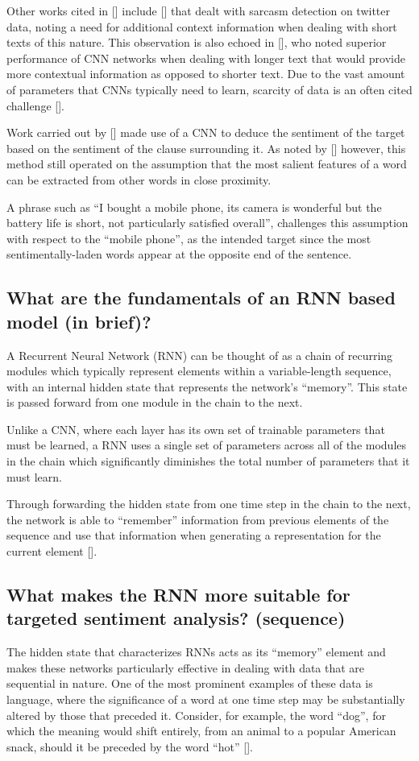 \documentclass[12pt, a4paper]{report}
\theoremstyle{definition}
\theoremstyle{definition}%
\theoremstyle{definition}%
\theoremstyle{definition}%
\theoremstyle{definition}%
\theoremstyle{definition}%
\renewcommand{\cite}[1]{[\citealp{#1}]}
\begin{document}
Other works cited in \cite{young2017} include \cite{poria2016} that dealt with sarcasm detection on twitter data, noting a need for additional context information when dealing with short texts of this nature. This observation is also echoed in \cite{johnsonzhang2015}, who noted superior performance of CNN networks when dealing with longer text that would provide more contextual information as opposed to shorter text. Due to the vast amount of parameters that CNNs typically need to learn, scarcity of data is an often cited challenge \cite{young2017}.

Work carried out by \cite{chen2016} made use of a CNN to deduce the sentiment of the target based on the sentiment of the clause surrounding it. As noted by \cite{chen2017} however, this method still operated on the assumption that the most salient features of a word can be extracted from other words in close proximity.

A phrase such as \enquote{I bought a mobile phone, its camera is wonderful but the battery life is short, not particularly satisfied overall}, challenges this assumption with respect to the \enquote{mobile phone}, as the intended target since the most sentimentally-laden words appear at the opposite end of the sentence.

\subsection{What are the fundamentals of an RNN based model (in brief)?}
A Recurrent Neural Network (RNN) can be thought of as a chain of recurring modules which typically represent elements within a variable-length sequence, with an internal hidden state that represents the network's \enquote{memory}. This state is passed forward from one module in the chain to the next.

Unlike a CNN, where each layer has its own set of trainable parameters that must be learned, a RNN uses a single set of parameters across all of the modules in the chain which significantly diminishes the total number of parameters that it must learn.

Through forwarding the hidden state from one time step in the chain to the next, the network is able to \enquote{remember} information from previous elements of the sequence and use that information when generating a representation for the current element \cite{tang2016b}.

\subsection{What makes the RNN more suitable for targeted sentiment analysis? (sequence)}
The hidden state that characterizes RNNs acts as its \enquote{memory} element and makes these networks particularly effective in dealing with data that are sequential in nature. One of the most prominent examples of these data is language, where the significance of a word at one time step may be substantially altered by those that preceded it. Consider, for example, the word \enquote{dog}, for which the meaning would shift entirely, from an animal to a popular American snack, should it be preceded by the word \enquote{hot} \cite{young2017}.
\end{document}
